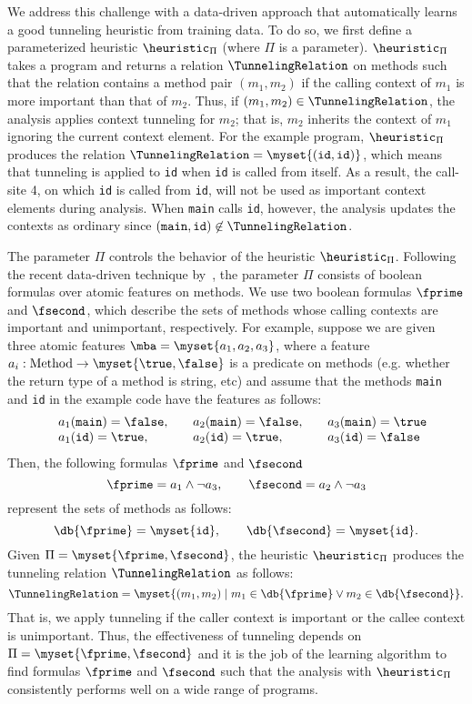 


We address this challenge with a data-driven approach that
automatically learns a good tunneling heuristic from training data.
To do so, we first define a parameterized heuristic $\heuristic_\Pi$
(where $\Pi$ is a parameter). $\heuristic_\Pi$ takes a program and
returns a relation $\TunnelingRelation$ on methods such that
the relation contains a method pair $(m_1, m_2)$ if the calling
context of $m_1$ is more important than that
of $m_2$. Thus, if $(m_1, m_2) \in \TunnelingRelation$, the analysis
applies context tunneling for $m_2$; that is, $m_2$ inherits the context of
$m_1$ ignoring the current context element. For
the example program, $\heuristic_\Pi$ produces the
relation $\TunnelingRelation = \myset{({\tt id}, {\tt id})}$, which means that tunneling is applied to
{\tt id} when {\tt id} is called from itself. As a result, the
call-site 4, on which {\tt id} is called from {\tt id}, will not
be used as important context elements during analysis.  When {\tt main} calls
{\tt id}, however, the analysis updates the contexts as ordinary since
$({\tt main}, {\tt id}) \not\in \TunnelingRelation$.

The parameter $\Pi$ controls the behavior of the heuristic
$\heuristic_\Pi$.
Following the recent data-driven technique by~\citet{JeJeChOh17}, the
parameter $\Pi$ consists of boolean formulas over
atomic features on methods. We use two boolean formulas $\fprime$ and
$\fsecond$, which describe the sets of methods whose calling contexts
are important and unimportant, respectively.
For example, suppose we are given three atomic features
$\mba = \myset{a_1,a_2,a_3}$, where a feature $a_i : \mbox{Method} \to \myset{\true, \false}$ is a
predicate on methods (e.g. whether the return type of a method is
string, etc) and
assume that the methods {\tt main} and {\tt id} in the example
code have the features as follows:
\[
\begin{array}{llll}
&a_1({\tt main}) = \false, \quad &a_2 ({\tt main}) = \false, \quad &a_3({\tt main}) =
\true \\
&a_1({\tt id}) = \true, \quad &a_2({\tt id}) = \true,  \quad& a_3({\tt id}) = \false
\end{array}
\]
Then, the following formulas $\fprime$ and $\fsecond$
\[
\fprime = a_1 \land \neg a_3, \qquad \fsecond = a_2 \land \neg a_3
\]
represent the sets of methods as follows:
\[
\db{\fprime} = \myset{{\tt id}}, \qquad \db{\fsecond}=\myset{{\tt id}}.
\]
Given $\Pi = \myset{\fprime, \fsecond}$, the heuristic
$\heuristic_\Pi$ produces the tunneling relation $\TunnelingRelation$
as follows:
\[
\TunnelingRelation = \myset{(m_1,m_2) \mid m_1 \in \db{\fprime} \vee m_2
  \in \db{\fsecond}}.
\]
That is, we apply tunneling if the caller context is important or the
callee context is unimportant.
Thus, the effectiveness of tunneling depends on $\Pi = \myset{\fprime,
  \fsecond}$ and it is the job of the learning algorithm to find
formulas $\fprime$ and $\fsecond$ such that the analysis with
$\heuristic_\Pi$ consistently performs well on a wide range of programs.

